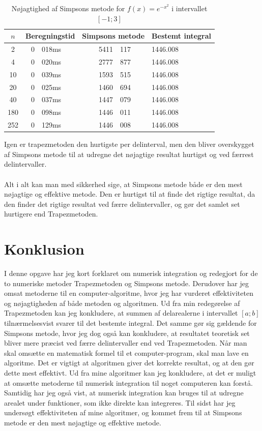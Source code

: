 \documentclass[12pt]{article}
\numberwithin{equation}{section}
\begin{document}
\begin{table}[H]
	\caption {Nøjagtighed af Simpsons metode for $f(x)=e^{-x^2}$ i intervallet $[-1;3]$} 
	\label{tab:simpsonsmetodeex2}
	\begin{center}
		\begin{tabular}{|c|r@{.}l|r @{.} l|l|}
			\hline $n$ & \multicolumn{2}{|c|}{Beregningstid} & \multicolumn{2}{|c|}{Simpsons metode} & Bestemt integral
			\\ 
			\hline 2 & 0&018ms & 5411&117 & 1446.008\\ 
			\hline 4 & 0&020ms & 2777&877 & 1446.008\\ 
			\hline 10 & 0&039ms & 1593&515 & 1446.008\\ 
			\hline 20 & 0&025ms & 1460&694 & 1446.008\\ 
			\hline 40 & 0&037ms & 1447&079 & 1446.008\\ 
			\hline 180 & 0&098ms & 1446&011 & 1446.008\\
			\hline 252 & 0&129ms & 1446&008 & 1446.008\\
			\hline 
		\end{tabular}
	\end{center}
\end{table}
Igen er trapezmetoden den hurtigste per delinterval, men den bliver overskygget af Simpsons metode til at udregne det nøjagtige resultat hurtigst og ved færrest delintervaller.
\\\\
Alt i alt kan man med sikkerhed sige, at Simpsons metode både er den mest nøjagtige og effektive metode. Den er hurtigst til at finde det rigtige resultat, da den finder det rigtige resultat ved færre delintervaller, og gør det samlet set hurtigere end Trapezmetoden.

\pagebreak
\section{Konklusion}
I denne opgave har jeg kort forklaret om numerisk integration og redegjort for de to numeriske metoder Trapezmetoden og Simpsons metode. Derudover har jeg omsat metoderne til en computer-algoritme, hvor jeg har vurderet effektiviteten og nøjagtigheden af både metoden og algoritmen. Ud fra min redegørelse af Trapezmetoden kan jeg konkludere, at summen af delarealerne i intervallet $[a;b]$ tilnærmelsesvist svarer til det bestemte integral. Det samme gør sig gældende for Simpsons metode, hvor jeg dog også kan konkludere, at resultatet teoretisk set bliver mere præcist ved færre delintervaller end ved Trapezmetoden. Når man skal omsætte en matematisk formel til et computer-program, skal man lave en algoritme. Det er vigtigt at algoritmen giver det korrekte resultat, og at den gør dette mest effektivt. Ud fra mine algoritmer kan jeg konkludere, at det er muligt at omsætte metoderne til numerisk integration til noget computeren kan forstå. Samtidig har jeg også vist, at numerisk integration kan bruges til at udregne arealet under funktioner, som ikke direkte kan integreres. Til sidst har jeg undersøgt effektiviteten af mine algoritmer, og kommet frem til at Simpsons metode er den mest nøjagtige og effektive metode.
\end{document}
